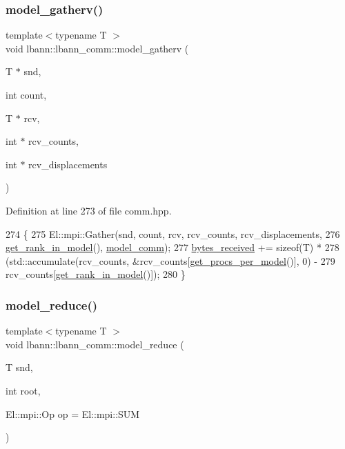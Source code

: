 \subsubsection{\texorpdfstring{model\+\_\+gatherv()}{model\_gatherv()}\hspace{0.1cm}{\footnotesize\ttfamily [2/2]}}
{\footnotesize\ttfamily template$<$typename T $>$ \\
void lbann\+::lbann\+\_\+comm\+::model\+\_\+gatherv (\begin{DoxyParamCaption}\item[{T $\ast$}]{snd,  }\item[{int}]{count,  }\item[{T $\ast$}]{rcv,  }\item[{int $\ast$}]{rcv\+\_\+counts,  }\item[{int $\ast$}]{rcv\+\_\+displacements }\end{DoxyParamCaption})\hspace{0.3cm}{\ttfamily [inline]}}



Definition at line 273 of file comm.\+hpp.


\begin{DoxyCode}
274                                              \{
275     El::mpi::Gather(snd, count, rcv, rcv\_counts, rcv\_displacements,
276                     \hyperlink{classlbann_1_1lbann__comm_a789453454468a3b70de768537c50ca52}{get\_rank\_in\_model}(), \hyperlink{classlbann_1_1lbann__comm_a58a75b76bd61ec8a26c1cbbec3dc2f45}{model\_comm});
277     \hyperlink{classlbann_1_1lbann__comm_afb99f57f7eafc0695bf28e6c26a8120f}{bytes\_received} += \textcolor{keyword}{sizeof}(T) *
278       (std::accumulate(rcv\_counts, &rcv\_counts[\hyperlink{classlbann_1_1lbann__comm_a5755dfdfc6377b4cae5ef8f7819e17de}{get\_procs\_per\_model}()], 0) -
279        rcv\_counts[\hyperlink{classlbann_1_1lbann__comm_a789453454468a3b70de768537c50ca52}{get\_rank\_in\_model}()]);
280   \}
\end{DoxyCode}
\mbox{\label{classlbann_1_1lbann__comm_a4903dbabf8f649abc2734510d434eed2}} 
\subsubsection{\texorpdfstring{model\+\_\+reduce()}{model\_reduce()}\hspace{0.1cm}{\footnotesize\ttfamily [1/4]}}
{\footnotesize\ttfamily template$<$typename T $>$ \\
void lbann\+::lbann\+\_\+comm\+::model\+\_\+reduce (\begin{DoxyParamCaption}\item[{T}]{snd,  }\item[{int}]{root,  }\item[{El\+::mpi\+::\+Op}]{op = {\ttfamily El\+:\+:mpi\+:\+:SUM} }\end{DoxyParamCaption})\hspace{0.3cm}{\ttfamily [inline]}}

